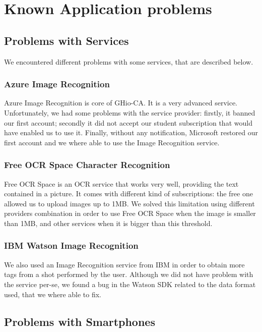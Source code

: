 \section{Known Application problems}
\label{sec:issues}

\subsection{Problems with Services}

We encountered different problems with some services, that are described below.

\subsubsection{Azure Image Recognition}

Azure Image Recognition is core of GHio-CA. It is a very advanced service.
Unfortunately, we had some problems with the service provider: firstly,
it banned our first account; secondly it did not accept our student
subscription that would have enabled us to use it.
Finally, without any notification, Microsoft restored our first account and we
where able to use the Image Recognition service.

\subsubsection{Free OCR Space Character Recognition}

Free OCR Space is an OCR service that works very well, providing the text contained in a 
picture.
It comes with different kind of subscriptions: the free one allowed us to upload
images up to 1MB. 
We solved this limitation using different providers combination in order to use
Free OCR Space when the image is smaller than 1MB, and other services 
when it is bigger than this threshold.

\subsubsection{IBM Watson Image Recognition}

We also used an Image Recognition service from IBM in order to obtain more tags
from a shot performed by the user.
Although we did not have problem with the service per-se, we found a bug in the 
Watson SDK related to the data format used, that we where able to fix.

\subsection{Problems with Smartphones}

